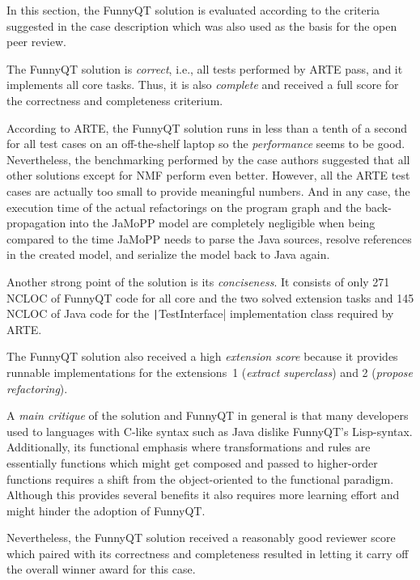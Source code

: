 \documentclass[submission]{eptcs}
\begin{document}
In this section, the FunnyQT solution is evaluated according to the criteria
suggested in the case description which was also used as the basis for the open
peer review.

The FunnyQT solution is \emph{correct}, i.e., all tests performed by ARTE pass,
and it implements all core tasks.  Thus, it is also \emph{complete} and
received a full score for the correctness and completeness criterium.

According to ARTE, the FunnyQT solution runs in less than a tenth of a second
for all test cases on an off-the-shelf laptop so the \emph{performance} seems
to be good.  Nevertheless, the benchmarking performed by the case authors
suggested that all other solutions except for NMF perform even better.
However, all the ARTE test cases are actually too small to provide meaningful
numbers.  And in any case, the execution time of the actual refactorings on the
program graph and the back-propagation into the JaMoPP model are completely
negligible when being compared to the time JaMoPP needs to parse the Java
sources, resolve references in the created model, and serialize the model back
to Java again.

Another strong point of the solution is its \emph{conciseness}.  It consists of
only 271 NCLOC of FunnyQT code for all core and the two solved extension tasks
and 145 NCLOC of Java code for the \texttt|TestInterface| implementation class
required by ARTE.

The FunnyQT solution also received a high \emph{extension score} because it
provides runnable implementations for the extensions~1 (\emph{extract
  superclass}) and 2 (\emph{propose refactoring}).

A \emph{main critique} of the solution and FunnyQT in general is that many
developers used to languages with C-like syntax such as Java dislike FunnyQT's
Lisp-syntax.  Additionally, its functional emphasis where transformations and
rules are essentially functions which might get composed and passed to
higher-order functions requires a shift from the object-oriented to the
functional paradigm.  Although this provides several benefits it also requires
more learning effort and might hinder the adoption of FunnyQT.

Nevertheless, the FunnyQT solution received a reasonably good reviewer score
which paired with its correctness and completeness resulted in letting it carry
off the overall winner award for this case.




\end{document}
